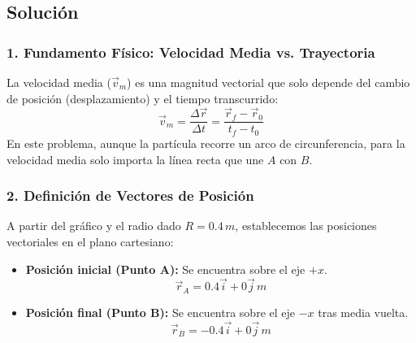 \documentclass[12pt, a4paper]{article}
\begin{document}
\begin{center}
\end{center}

\subsection*{Solución}

\subsubsection*{1. Fundamento Físico: Velocidad Media vs. Trayectoria}

La velocidad media ($\vec{v}_m$) es una magnitud vectorial que solo depende del cambio de posición (desplazamiento) y el tiempo transcurrido:
\begin{equation}
    \vec{v}_m = \frac{\Delta \vec{r}}{\Delta t} = \frac{\vec{r}_f - \vec{r}_0}{t_f - t_0}
\end{equation}
En este problema, aunque la partícula recorre un arco de circunferencia, para la velocidad media solo importa la línea recta que une $A$ con $B$.

\subsubsection*{2. Definición de Vectores de Posición}

A partir del gráfico y el radio dado $R = 0.4 \, \si{m}$, establecemos las posiciones vectoriales en el plano cartesiano:
\begin{itemize}
    \item \textbf{Posición inicial (Punto A):} Se encuentra sobre el eje $+x$.
    \begin{equation}
        \vec{r}_A = 0.4\vec{i} + 0\vec{j} \, \si{m}
    \end{equation}
    \item \textbf{Posición final (Punto B):} Se encuentra sobre el eje $-x$ tras media vuelta.
    \begin{equation}
        \vec{r}_B = -0.4\vec{i} + 0\vec{j} \, \si{m}
    \end{equation}
\end{itemize}
\end{document}
